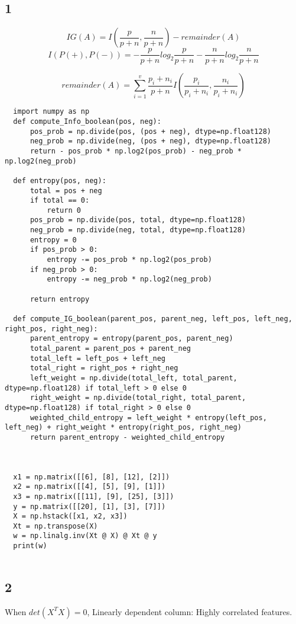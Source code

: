 \documentclass{article}
\begin{document}
\subsection*{1}
\[IG(A) = I(\frac{p}{p + n}, \frac{n}{p + n}) - remainder(A)\]
\[I(P(+), P(-)) = -\frac{p}{p + n}log_2 \frac{p}{p + n} - \frac{n}{p+n}log_2\frac{n}{p+n}\]

\[remainder(A) = \sum_{i=1}^{v}\frac{p_i + n_i}{p + n}I(\frac{p_i}{p_i + n_i}, \frac{n_i}{p_i + n_i})\]
\begin{lstlisting}
  import numpy as np
  def compute_Info_boolean(pos, neg):
      pos_prob = np.divide(pos, (pos + neg), dtype=np.float128)
      neg_prob = np.divide(neg, (pos + neg), dtype=np.float128)
      return - pos_prob * np.log2(pos_prob) - neg_prob * np.log2(neg_prob)
  
  def entropy(pos, neg):
      total = pos + neg
      if total == 0: 
          return 0
      pos_prob = np.divide(pos, total, dtype=np.float128)
      neg_prob = np.divide(neg, total, dtype=np.float128)
      entropy = 0
      if pos_prob > 0:
          entropy -= pos_prob * np.log2(pos_prob)
      if neg_prob > 0:
          entropy -= neg_prob * np.log2(neg_prob)
  
      return entropy
  
  def compute_IG_boolean(parent_pos, parent_neg, left_pos, left_neg, right_pos, right_neg):
      parent_entropy = entropy(parent_pos, parent_neg)
      total_parent = parent_pos + parent_neg
      total_left = left_pos + left_neg
      total_right = right_pos + right_neg
      left_weight = np.divide(total_left, total_parent, dtype=np.float128) if total_left > 0 else 0
      right_weight = np.divide(total_right, total_parent, dtype=np.float128) if total_right > 0 else 0
      weighted_child_entropy = left_weight * entropy(left_pos, left_neg) + right_weight * entropy(right_pos, right_neg)
      return parent_entropy - weighted_child_entropy
  
  
  
  x1 = np.matrix([[6], [8], [12], [2]])
  x2 = np.matrix([[4], [5], [9], [1]])
  x3 = np.matrix([[11], [9], [25], [3]])
  y = np.matrix([[20], [1], [3], [7]])
  X = np.hstack([x1, x2, x3])
  Xt = np.transpose(X)
  w = np.linalg.inv(Xt @ X) @ Xt @ y
  print(w)
  
\end{lstlisting}


\subsection*{2}
When $det(X^TX) = 0$, Linearly dependent column: Highly correlated features.
\end{document}
